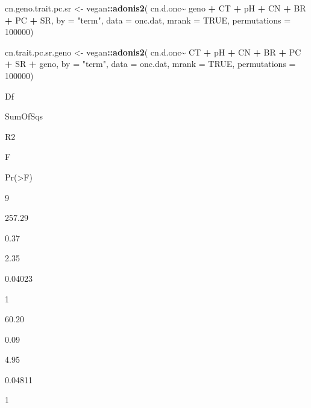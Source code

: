\documentclass[
]{article}
\newenvironment{Shaded}{\begin{snugshade}}{\end{snugshade}}
\newcommand{\AttributeTok}[1]{\textcolor[rgb]{0.13,0.29,0.53}{#1}}
\newcommand{\ConstantTok}[1]{\textcolor[rgb]{0.56,0.35,0.01}{#1}}
\newcommand{\DecValTok}[1]{\textcolor[rgb]{0.00,0.00,0.81}{#1}}
\newcommand{\FunctionTok}[1]{\textcolor[rgb]{0.13,0.29,0.53}{\textbf{#1}}}
\newcommand{\NormalTok}[1]{#1}
\newcommand{\OtherTok}[1]{\textcolor[rgb]{0.56,0.35,0.01}{#1}}
\newcommand{\SpecialCharTok}[1]{\textcolor[rgb]{0.81,0.36,0.00}{\textbf{#1}}}
\newcommand{\StringTok}[1]{\textcolor[rgb]{0.31,0.60,0.02}{#1}}
\begin{document}
\begin{Shaded}
\begin{Highlighting}[]
\NormalTok{cn.geno.trait.pc.sr }\OtherTok{\textless{}{-}}\NormalTok{ vegan}\SpecialCharTok{::}\FunctionTok{adonis2}\NormalTok{(}
\NormalTok{                               cn.d.onc}\SpecialCharTok{\textasciitilde{}}\NormalTok{ geno }\SpecialCharTok{+}\NormalTok{ CT }\SpecialCharTok{+}\NormalTok{ pH }\SpecialCharTok{+}\NormalTok{ CN }\SpecialCharTok{+}\NormalTok{ BR }\SpecialCharTok{+}\NormalTok{ PC }\SpecialCharTok{+}\NormalTok{ SR,}
                               \AttributeTok{by =} \StringTok{"term"}\NormalTok{, }
                               \AttributeTok{data =}\NormalTok{ onc.dat, }
                               \AttributeTok{mrank =} \ConstantTok{TRUE}\NormalTok{,}
                               \AttributeTok{permutations =} \DecValTok{100000}\NormalTok{)}

\NormalTok{cn.trait.pc.sr.geno  }\OtherTok{\textless{}{-}}\NormalTok{ vegan}\SpecialCharTok{::}\FunctionTok{adonis2}\NormalTok{(}
\NormalTok{                                   cn.d.onc}\SpecialCharTok{\textasciitilde{}}\NormalTok{ CT }\SpecialCharTok{+}\NormalTok{ pH }\SpecialCharTok{+}\NormalTok{ CN }\SpecialCharTok{+}\NormalTok{ BR }\SpecialCharTok{+}\NormalTok{ PC }\SpecialCharTok{+}\NormalTok{ SR }\SpecialCharTok{+}\NormalTok{ geno,}
                                   \AttributeTok{by =} \StringTok{"term"}\NormalTok{, }
                                   \AttributeTok{data =}\NormalTok{ onc.dat, }
                                   \AttributeTok{mrank =} \ConstantTok{TRUE}\NormalTok{,}
                                   \AttributeTok{permutations =} \DecValTok{100000}\NormalTok{)}
\end{Highlighting}
\end{Shaded}

Df

SumOfSqs

R2

F

Pr(\textgreater F)

9

257.29

0.37

2.35

0.04023

1

60.20

0.09

4.95

0.04811

1
\end{document}
